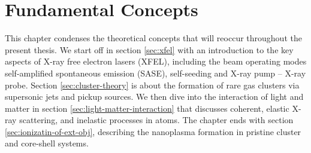 \chapter{Fundamental Concepts}\label{ch:fundamental_concepts}
This chapter condenses the theoretical concepts that will reoccur throughout the present thesis. We start off in section \ref{sec:xfel} with an introduction to the key aspects of X-ray free electron lasers (XFEL), including the beam operating modes self-amplified spontaneous emission (SASE), self-seeding and X-ray pump -- X-ray probe. Section \ref{sec:cluster-theory} is about the formation of rare gas clusters via supersonic jets and pickup sources. We then dive into the interaction of light and matter in section \ref{sec:light-matter-interaction} that discusses coherent, elastic X-ray scattering, and inelastic processes in atoms. The chapter ends with section \ref{sec:ionizatin-of-ext-obj}, describing the nanoplasma formation in pristine cluster and core-shell systems.
%
%
%
